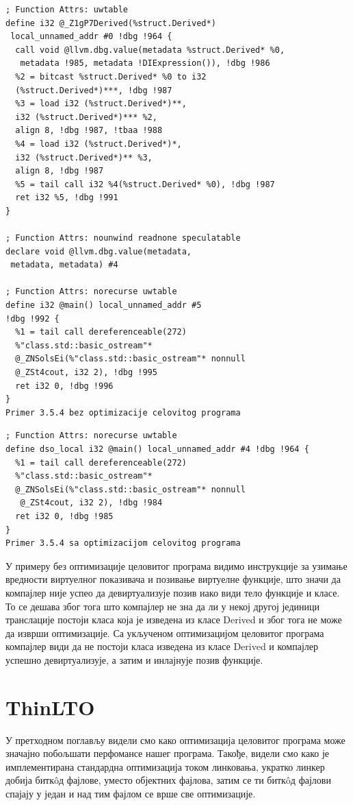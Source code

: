 \documentclass[12pt,oneside]{memoir}
\begin{document}
\begin{lstlisting}
; Function Attrs: uwtable
define i32 @_Z1gP7Derived(%struct.Derived*)
 local_unnamed_addr #0 !dbg !964 {
  call void @llvm.dbg.value(metadata %struct.Derived* %0,
   metadata !985, metadata !DIExpression()), !dbg !986
  %2 = bitcast %struct.Derived* %0 to i32 
  (%struct.Derived*)***, !dbg !987
  %3 = load i32 (%struct.Derived*)**, 
  i32 (%struct.Derived*)*** %2, 
  align 8, !dbg !987, !tbaa !988
  %4 = load i32 (%struct.Derived*)*, 
  i32 (%struct.Derived*)** %3, 
  align 8, !dbg !987
  %5 = tail call i32 %4(%struct.Derived* %0), !dbg !987
  ret i32 %5, !dbg !991
}

; Function Attrs: nounwind readnone speculatable
declare void @llvm.dbg.value(metadata,
 metadata, metadata) #4

; Function Attrs: norecurse uwtable
define i32 @main() local_unnamed_addr #5 
!dbg !992 {
  %1 = tail call dereferenceable(272) 
  %"class.std::basic_ostream"* 
  @_ZNSolsEi(%"class.std::basic_ostream"* nonnull 
  @_ZSt4cout, i32 2), !dbg !995
  ret i32 0, !dbg !996
}
Primer 3.5.4 bez optimizacije celovitog programa
\end{lstlisting}

\begin{lstlisting}
; Function Attrs: norecurse uwtable
define dso_local i32 @main() local_unnamed_addr #4 !dbg !964 {
  %1 = tail call dereferenceable(272) 
  %"class.std::basic_ostream"* 
  @_ZNSolsEi(%"class.std::basic_ostream"* nonnull
   @_ZSt4cout, i32 2), !dbg !984
  ret i32 0, !dbg !985
}
Primer 3.5.4 sa optimizacijom celovitog programa
\end{lstlisting}

У примеру без оптимизације целовитог програма видимо инструкције за узимање вредности
виртуелног показивача и позивање виртуелне функције, што значи да компајлер није успео
да девиртуализује позив иако види тело функције и класе.
То се дешава због тога што компајлер не зна да ли у некој другој јединици транслације
постоји класа која је изведена из класе Derived и због тога не може да изврши
оптимизације.
Са укљученом оптимизацијом целовитог програма компајлер види да не постоји класа
изведена из класе Derived и компајлер успешно девиртуализује, а затим и инлајнује
позив функције. 
 
 \chapter{ThinLTO}
 
 У претходном поглављу видели смо како оптимизација целовитог програма може значајно
 побољшати перфомансе нашег програма.
 Такође, видели смо како је имплементирана стандардна оптимизација током линковања,
 укратко линкер добија битк\^{o}д фајлове, уместо објектних фајлова, затим се ти
 битк\^{o}д фајлови спајају у један и над тим фајлом се врше све оптимизације.
 
\end{document}
